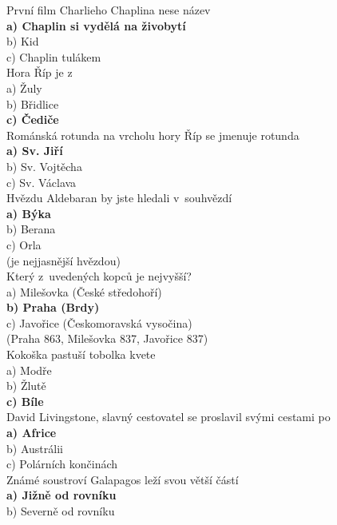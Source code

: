 \begin{multicols}{3}
\noindent
První film Charlieho Chaplina nese název\\
\textbf{a) Chaplin si vydělá na živobytí}\\
b) Kid\\
c) Chaplin tulákem\\

\noindent
Hora Říp je z \\
a) Žuly\\
b) Břidlice\\
\textbf{c) Čediče}\\

\noindent
Románská rotunda na vrcholu hory Říp se jmenuje rotunda\\
\textbf{a) Sv. Jiří}\\
b) Sv. Vojtěcha\\
c) Sv. Václava\\

\noindent
Hvězdu Aldebaran by jste hledali v~souhvězdí\\
\textbf{a) Býka}\\
b) Berana\\
c) Orla\\
(je nejjasnější hvězdou)\\

\noindent
Který z~uvedených kopců je nejvyšší?\\
a) Milešovka (České středohoří)\\
\textbf{b) Praha (Brdy)}\\
c) Javořice (Českomoravská vysočina)\\
(Praha 863, Milešovka 837, Javořice 837)\\

\noindent
Kokoška pastuší tobolka kvete\\
a) Modře\\
b) Žlutě\\
\textbf{c) Bíle}\\

\noindent
David Livingstone, slavný cestovatel se proslavil svými cestami 
po\\
\textbf{a) Africe}\\
b) Austrálii\\
c) Polárních končinách\\

\noindent
Známé soustroví Galapagos leží svou větší částí\\
\textbf{a) Jižně od rovníku}\\
b) Severně od rovníku\\


\end{multicols}

